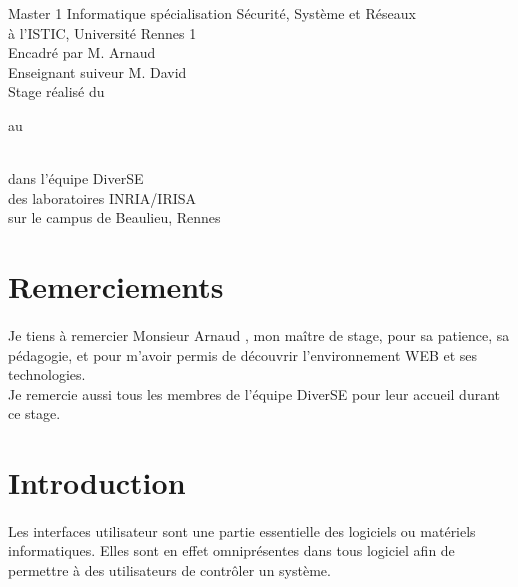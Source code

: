 \documentclass[11pt, a4paper, pdftex]{article}
\begin{document}
    \maketitle
    \thispagestyle{pagedegarde}
    \begin{center}
        \vspace{0.25cm} Master 1 Informatique spécialisation Sécurité, Système et Réseaux \\ à l'ISTIC, Université Rennes 1 \\
        \vspace{0.25cm} Encadré par M. Arnaud  \\
        \vspace{0.25cm} Enseignant suiveur M. David  \\
        \vspace{0.25cm} Stage réalisé du \date{15 mai 2018} au \date{31 août 2018} \\ \vspace{0.25cm} dans l'équipe DiverSE \\ des laboratoires INRIA/IRISA \\ sur le campus de Beaulieu, Rennes
    \end{center}


    \newpage
    \clearpage
    \setcounter{page}{1}
    \pagestyle{document}
    \section*{Remerciements}\label{sec:remerciement}
    \paragraph{}
    Je tiens à remercier Monsieur Arnaud , mon maître de stage, pour sa patience, sa pédagogie, et pour m'avoir permis de découvrir l'environnement WEB et ses technologies. \\
    Je remercie aussi tous les membres de l'équipe DiverSE pour leur accueil durant ce stage.
    \newpage

    \tableofcontents

    \newpage

    \section{Introduction}\label{sec:introduction}
        \paragraph{}
            Les interfaces utilisateur sont une partie essentielle des logiciels ou matériels informatiques.
            Elles sont en effet omniprésentes dans tous logiciel afin de permettre à des utilisateurs de contrôler un système.
\end{document}

